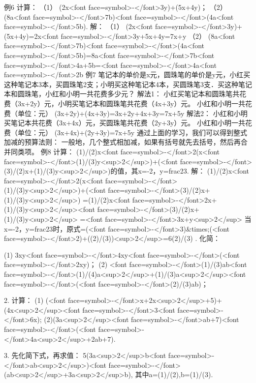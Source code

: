 		\beginexample
			例6 计算：
			（1）  (2x<font face=symbol>-</font>3y)+(5x+4y)；  （2）  (8a<font face=symbol>-</font>7b)<font face=symbol>-</font>(4a<font face=symbol>-</font>5b).
			解： （1）  (2x<font face=symbol>-</font>3y)+(5x+4y)=2x<font face=symbol>-</font>3y+5x+4y=7x+y
			（2）  (8a<font face=symbol>-</font>7b)<font face=symbol>-</font>(4a<font face=symbol>-</font>5b)=8a<font face=symbol>-</font>7b<font face=symbol>-</font>4a+5b=<font face=symbol>-</font>4a<font face=symbol>-</font>2b
			例7  笔记本的单价是x元，圆珠笔的单价是y元，小红买这种笔记本3本，买圆珠笔2支；小明买这种笔记本4本，买圆珠笔3支．买这种笔记本和圆珠笔，小红和小明一共花费多少元？
			解法1： 小红买笔记本和圆珠笔共花费（3x+2y）元，小明买笔记本和圆珠笔共花费（4x+3y）元。
			       小红和小明一共花费（单位：元）
			            (3x+2y)+(4x+3y)=3x+2y+4x+3y=7x+5y
			解法2： 小红和小明买笔记本共花费（3x+4x）元，买圆珠笔共花费（2y+3y）元。
			        小红和小明一共花费（单位：元）
			            (3x+4x)+(2y+3y)=7x+5y
		\endexample
		 通过上面的学习，我们可以得到整式加减的预算法则：
		 一般地，几个整式相加减，如果有括号就先去括号，然后再合并同类项。
		\beginexample
			例8 计算： (1)/(2)x<font face=symbol>-</font>2(x<font face=symbol>-</font>(1)/(3)y<sup>2</sup>)+(<font face=symbol>-</font>(3)/(2)x+(1)/(3)y<sup>2</sup>)的值，其x=-2，y=frac23.
			解：   (1)/(2)x<font face=symbol>-</font>2(x<font face=symbol>-</font>(1)/(3)y<sup>2</sup>)+(<font face=symbol>-</font>(3)/(2)x+(1)/(3)y<sup>2</sup>)
			     =(1)/(2)x<font face=symbol>-</font>2x+(1)/(3)y<sup>2</sup><font face=symbol>-</font>(3)/(2)x+(1)/(3)y<sup>2</sup>
			     =<font face=symbol>-</font>3x+y<sup>2</sup>
			当x=-2，y=frac23时，原式=(<font face=symbol>-</font>3)&times;(<font face=symbol>-</font>2)+((2)/(3))<sup>2</sup>=6(2)/(3)
		\endexample
	    . 化简：
	    	
	    	(1) 3xy<font face=symbol>-</font>4xy<font face=symbol>-</font>(<font face=symbol>-</font>2xy)；     (2) <font face=symbol>-</font>(1)/(3)ab<font face=symbol>-</font>(1)/(4)a<sup>2</sup>+(1)/(3)a<sup>2</sup><font face=symbol>-</font>(<font face=symbol>-</font>(2)/(3)ab)；
	    	
	    	2. 计算：
	    	(1) (<font face=symbol>-</font>x+2x<sup>2</sup>+5)+(4x<sup>2</sup><font face=symbol>-</font>3<font face=symbol>-</font>6x);   (2)(3a<sup>2</sup><font face=symbol>-</font>ab+7)<font face=symbol>-</font>(<font face=symbol>-</font>4a<sup>2</sup>+2ab+7).
	    	
	    	3. 先化简下式，再求值：
	    	                5(3a<sup>2</sup>b<font face=symbol>-</font>ab<sup>2</sup>)<font face=symbol>-</font>(ab<sup>2</sup>+3a<sup>2</sup>b),
	    	   其中a=(1)/(2),b=(1)/(3).
	    	
